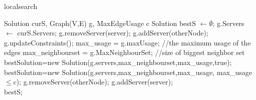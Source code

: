 \documentclass [12pt]{article}
\begin{document}
\begin {algorithm} [H]
\caption {localsearch}
\label {localS}
\begin {algorithmic} [3]
\Require Solution curS, Graph(V,E) g, MaxEdgeUsage c 
\State Solution bestS $\gets \emptyset$;
\State g.Servers $\gets$ curS.Servers;
\State    g.removeServer(server);
\State g.addServer(otherNode);
\State g.updateConstraints();
\State max\_usage = g.maxUsage; //the maximum usage of the edges
\State max\_neighbourset = g.MaxNeighbourSet; //size of biggest neighbor set
\State bestSolution=new Solution(g.servers,max\_neighbourset,max\_usage,true);
\EndIf 
{}
\State bestSolution=new Solution(g.servers,max\_neighbourset,max\_usage, max\_usage$\leq$c);
\EndIf
\State g.removeServer(otherNode);
\EndIf
\EndFor
\State g.addServer(server);
\EndFor\\
\Return  bestS;
\end {algorithmic}
\end {algorithm}
\end{document}
